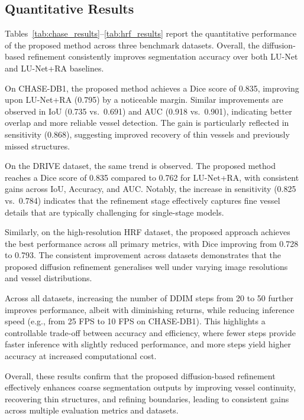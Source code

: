 \documentclass[journal,article,submit,pdftex,moreauthors]{Definitions/mdpi}
\begin{document}
\subsection{Quantitative Results}

Tables~\ref{tab:chase_results}--\ref{tab:hrf_results} report the quantitative performance of the proposed method across three benchmark datasets. Overall, the diffusion-based refinement consistently improves segmentation accuracy over both LU-Net and LU-Net+RA baselines.

On CHASE-DB1, the proposed method achieves a Dice score of 0.835, improving upon LU-Net+RA (0.795) by a noticeable margin. Similar improvements are observed in IoU (0.735 vs.\ 0.691) and AUC (0.918 vs.\ 0.901), indicating better overlap and more reliable vessel detection. The gain is particularly reflected in sensitivity (0.868), suggesting improved recovery of thin vessels and previously missed structures.

On the DRIVE dataset, the same trend is observed. The proposed method reaches a Dice score of 0.835 compared to 0.762 for LU-Net+RA, with consistent gains across IoU, Accuracy, and AUC. Notably, the increase in sensitivity (0.825 vs.\ 0.784) indicates that the refinement stage effectively captures fine vessel details that are typically challenging for single-stage models.

Similarly, on the high-resolution HRF dataset, the proposed approach achieves the best performance across all primary metrics, with Dice improving from 0.728 to 0.793. The consistent improvement across datasets demonstrates that the proposed diffusion refinement generalises well under varying image resolutions and vessel distributions.

Across all datasets, increasing the number of DDIM steps from 20 to 50 further improves performance, albeit with diminishing returns, while reducing inference speed (e.g., from 25 FPS to 10 FPS on CHASE-DB1). This highlights a controllable trade-off between accuracy and efficiency, where fewer steps provide faster inference with slightly reduced performance, and more steps yield higher accuracy at increased computational cost.

Overall, these results confirm that the proposed diffusion-based refinement effectively enhances coarse segmentation outputs by improving vessel continuity, recovering thin structures, and refining boundaries, leading to consistent gains across multiple evaluation metrics and datasets.
\end{document}
